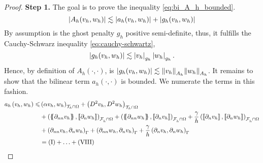 \begin{proof}
         \textbf{Step 1.} The goal is to prove the inequality \eqref{eq:bi_A_h_bounded}.
         \begin{equation}
                \left\lvert  A_{h}( v_{h} ,w_{h} )  \right\rvert \lesssim   \left\lvert a_{h}( v_{h}, w_{h})  \right\rvert   + \left\lvert g_{h}( v_{h},w_{h})   \right\rvert
         \end{equation}
                By assumption is the ghost penalty $g_{h}$ positive semi-definite, thus, it fulfills the Cauchy-Schwarz inequality \eqref{eq:cauchy-schwartz},
                \begin{equation}
                \left\lvert  g_{h}(v_{h},w_{h} )  \right\rvert \lesssim \left\lvert  v_{h}  \right\rvert _{g_{h}}\left\lvert  w_{h}  \right\rvert_{g_{h}}.
                \end{equation}
                Hence, by definition of $A_{h}( \cdot ,\cdot ) $, is $\left\lvert  g_{h}(v_{h},w_{h} )  \right\rvert \lesssim \| v_{h} \|_{ A_{h} }^{  } \| w_{h} \|_{ A_{h} }^{  } $. It remains to show that the bilinear term $ a_{h}( \cdot ,\cdot ) $ is bounded. We numerate the terms in this fashion.
                \begin{equation}
                    \begin{split}
                         a_{h} \left( v_{h}, w_{h} \right)    \le  &   \left( \alpha  v_{h}, w_{h} \right) _{\mathcal{T} _{h} \cap \Omega }      +  \left( D^2 v_{h}, D^2w_{h} \right) _{\mathcal{T} _{h} \cap \Omega}    \\
                                                     & + \left( \mean{  \partial _{n n} v_{h} }, \jump{ \partial _{n }w_{h}} \right)_{\mathcal{F}_{h}^{} \cap \Omega}     + \left( \mean{ \partial _{nn } w_{h} }, \jump{ \partial _{n}v_{h} }
                                                     \right)_{\mathcal{F}_{h}^{} \cap \Omega}+ \frac{\gamma }{h}  \left( \jump{ \partial _{n} v_{h}}, \jump{ \partial _{n} w_{h}   }   \right)_{\mathcal{F}_{h}^{} \cap \Omega}   \\
                                                     & + \left(  \partial _{n n} v_{h} ,  \partial _{n }w_{h} \right)_{\Gamma } + \left(  \partial _{n n} w_{h} ,  \partial _{n}v_{h}       \right)_{\Gamma }   + \frac{\gamma }{h}  \left(  \partial _{n}
                                                         v_{h},  \partial
                                                     _{n} w_{h} \right)_{\Gamma } \\
                                                     &=  ( \mathrm{I} ) + \ldots+( \mathrm{VIII} )     \\
                    \end{split}

\end{equation}
\end{proof}
